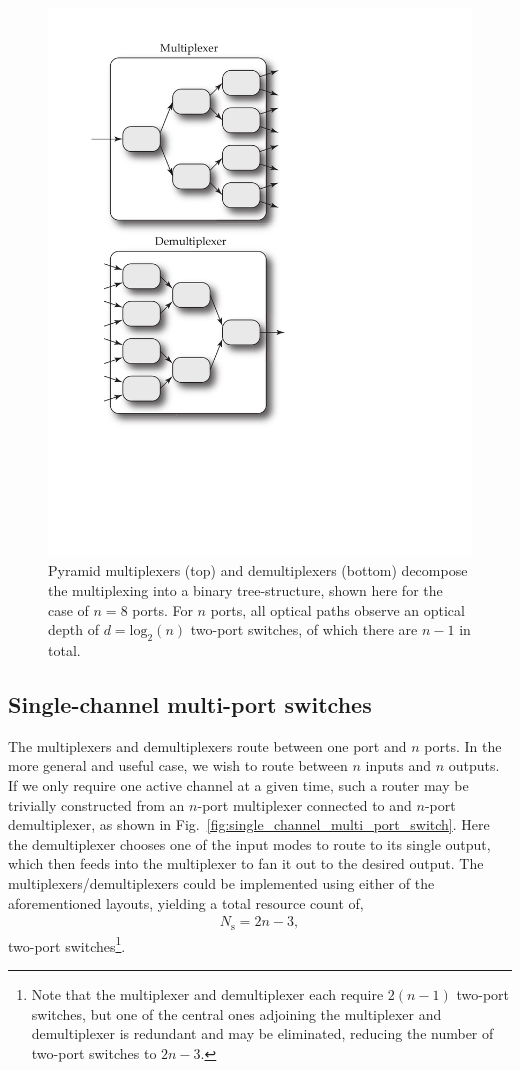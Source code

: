 \documentclass[aps,rmp,twocolumn,amsmath,amssymb,nofootinbib,superscriptaddress,longbibliography,floatfix,table-of-contents,eqsecnum]{revtex4-1}
\begin{document}
\begin{figure}[!htb]
\includegraphics[width=0.7\columnwidth]{pyramid_multiplexer}
\caption{Pyramid multiplexers (top) and demultiplexers (bottom) decompose the multiplexing into a binary tree-structure, shown here for the case of \mbox{$n=8$} ports. For $n$ ports, all optical paths observe an optical depth of \mbox{$d=\mathrm{log}_2(n)$} two-port switches, of which there are \mbox{$n-1$} in total.} \label{fig:pyramid_multiplexer} 
\end{figure}

%
%

\subsection{Single-channel multi-port switches} 

The multiplexers and demultiplexers route between one port and $n$ ports. In the more general and useful case, we wish to route between $n$ inputs and $n$ outputs. If we only require one active channel at a given time, such a router may be trivially constructed from an $n$-port multiplexer connected to and $n$-port demultiplexer, as shown in Fig.~\ref{fig:single_channel_multi_port_switch}. Here the demultiplexer chooses one of the input modes to route to its single output, which then feeds into the multiplexer to fan it out to the desired output. The multiplexers/demultiplexers could be implemented using either of the aforementioned layouts, yielding a total resource count of,
\begin{align}
	N_\mathrm{s} = 2n-3,
\end{align}
two-port switches\footnote{Note that the multiplexer and demultiplexer each require \mbox{$2(n-1)$} two-port switches, but one of the central ones adjoining the multiplexer and demultiplexer is redundant and may be eliminated, reducing the number of two-port switches to \mbox{$2n-3$}.}.
\end{document}
